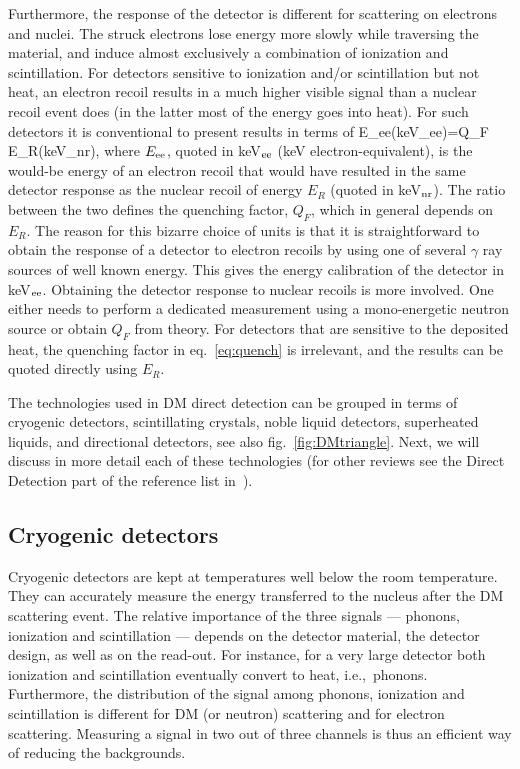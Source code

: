  \smallskip
 
  Furthermore,  the response of the detector is different for scattering on electrons and nuclei. The struck electrons lose energy more slowly while traversing the material, and induce almost exclusively a combination of ionization and scintillation.  For detectors sensitive to ionization and/or scintillation but not heat, an electron recoil results in a much higher visible signal than a nuclear recoil event does (in the latter most of the energy goes into heat).  For such detectors it is conventional to present results in terms of 
\beq
\label{eq:quench}
E_{\rm ee}({\rm keV}_{\rm ee})=Q_F \times E_R({\rm keV}_{\rm nr}),
\eeq
where $E_{\rm ee}$, quoted  in keV${}_{\rm ee}$ (keV electron-equivalent), is the would-be energy of an electron recoil that would have resulted in the same detector response as the
nuclear recoil of energy $E_R$ (quoted in keV${}_{\rm nr}$).
The ratio between the two defines the quenching factor, $Q_F$, which in general depends on $E_R$. 
The reason for this bizarre choice of units is that it is straightforward to obtain the response of a detector to electron recoils by using one of several $\gamma$ ray sources of well known energy. This gives the energy calibration of the detector in  keV${}_{\rm ee}$. 
Obtaining the detector response to nuclear recoils is more involved. 
One either needs to perform a dedicated measurement using a mono-energetic neutron source or obtain $Q_F$ from theory. For detectors that are sensitive to the deposited heat, the quenching factor in eq.~\eqref{eq:quench} is irrelevant, and the results can be quoted directly using $E_R$. 

The technologies used in DM direct detection can be grouped in terms of 
cryogenic detectors, scintillating crystals, noble liquid detectors, superheated liquids,  and directional detectors, see also fig.~\ref{fig:DMtriangle}. 
Next, we will discuss in more detail each of these technologies (for other reviews see the Direct Detection part of the reference list in~\cite{otherpastDMreviews}).

\subsection{Cryogenic detectors}
Cryogenic detectors are kept at temperatures well below the room temperature. 
They can accurately measure the energy transferred to the nucleus after the DM scattering event. 
The relative importance of the three signals --- phonons, ionization and scintillation --- depends on the detector material, the detector design, as well as on the read-out. For instance, for a very large detector both ionization and scintillation eventually convert to heat, i.e.,\ phonons. Furthermore, the distribution of the signal among phonons, ionization and scintillation is different for DM (or neutron) scattering and for electron scattering. 
Measuring a signal in two out of three channels is thus an efficient way of reducing the backgrounds.  

